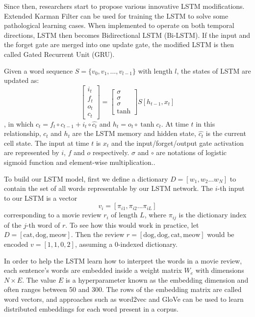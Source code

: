 \documentclass[conference]{IEEEtran}
\begin{document}
    Since then, researchers start to propose various innovative LSTM modifications.
    Extended Karman Filter can be used for training the LSTM to solve some pathological
    learning cases\cite{perez2003kalman}. When implemented to operate on both temporal
    directions, LSTM then becomes Bidirectional LSTM
    (Bi-LSTM)\cite{schuster1997bidirectional,barnes2017assessing}.
    If the input and the forget gate are merged into one update gate, the modified LSTM
    is then called Gated Recurrent Unit (GRU)\cite{cho2014learning}.

    Given a word sequence $S=\{v_0,v_1,\ldots,v_{l-1}\}$ with length $l$, the states
    of LSTM are updated as:
    $$
    \begin{bmatrix}
    i_t\\f_t\\o_t\\c_t
    \end{bmatrix} =
    \begin{bmatrix}
    \sigma\\\sigma\\\sigma\\\tanh
    \end{bmatrix}
    S[h_{t-1},x_t]
    $$
    , in which $c_t=f_t\circ c_{t-1} + i_t\circ\hat{c_t}$ and $h_t=o_t\circ\tanh{c_t}$.
    At time $t$ in this relationship, $c_t$ and $h_t$ are the LSTM memory and
    hidden state, $\hat{c_t}$ is the current cell state. The input at time $t$
    is $x_t$ and the input/forget/output gate activation are represented by $i$,
    $f$ and $o$ respectively. $\sigma$ and $\circ$ are notations of logistic
    sigmoid function and element-wise multiplication.\cite{zhou2016text}.

    To build our LSTM model, first we define a dictionary
    $D = [w_1, w_2...w_N]$
    to contain the set of all words representable by our LSTM network. The $i$-th
    input to our LSTM is a vector
    $$
    v_i = [ \pi_{i1}, \pi_{i2}... \pi_{iL}]
    $$
    corresponding to a movie review $r_i$ of length $L$, where $\pi_{ij}$ is the dictionary index of
    the $j$-th word of $r$. To see how this would work in practice, let
    $D = [\text{cat}, \text{dog}, \text{meow}]$. Then the review
    $r =  [\text{dog}, \text{dog}, \text{cat}, \text{meow}]$ would be encoded
    $v = [1, 1, 0, 2]$, assuming a 0-indexed dictionary.

    In order to help the LSTM learn how to interpret the words in a movie review,
    each sentence's words are embedded inside a weight matrix $W_e$ with
    dimensions $N \times E$. The value $E$ is a hyperparameter known as the
    embedding dimension and often ranges between 50 and 300. The rows of the
    embedding matrix are called word vectors, and approaches such as word2vec
    \cite{word2vec} and GloVe \cite{pennington2014glove} can be used to learn
    distributed embeddings for each word present in a corpus.
\end{document}
